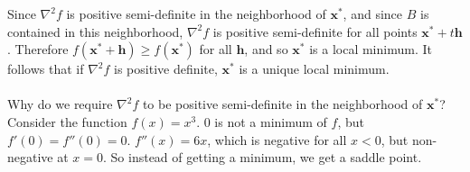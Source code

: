 \documentclass{article}
\begin{document}
Since $\nabla^2f$ is positive semi-definite in the neighborhood of $\mathbf{x^*}$, and since $B$ is contained in this neighborhood, $\nabla^2f$ is positive semi-definite for all points $\mathbf{x}^* + t\mathbf{h}$. Therefore $f(\mathbf{x^* + h}) \geq f(\mathbf{x^*})$ for all $\mathbf{h}$, and so $\mathbf{x^*}$ is a local minimum. It follows that if $\nabla^2 f$ is positive definite, $\mathbf{x}^*$ is a unique local minimum. \\\\
Why do we require $\nabla^2f$ to be positive semi-definite in the neighborhood of $\mathbf{x}^*$? Consider the function $f(x) = x^3$. 0 is not a minimum of $f$, but $f'(0) = f''(0) = 0$. $f''(x) = 6x$, which is negative for all $x < 0$, but non-negative at $x = 0$. So instead of getting a minimum, we get a saddle point.

\clearpage
\end{document}

